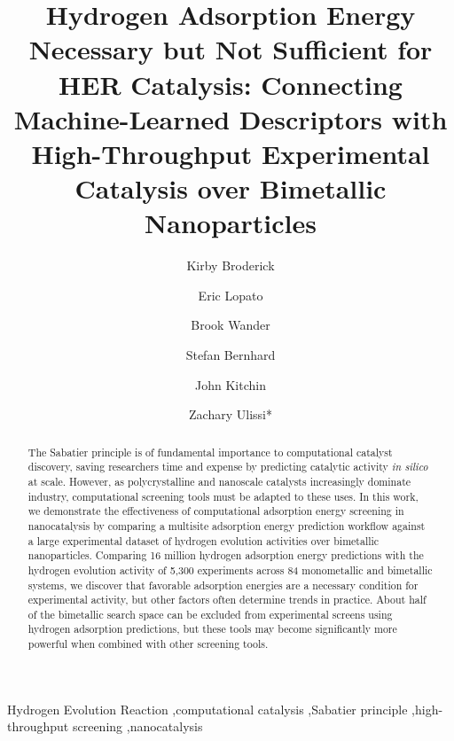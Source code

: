 \documentclass[preprint,12pt]{elsarticle}
\begin{document}
\begin{frontmatter}

\title{Hydrogen Adsorption Energy Necessary but Not Sufficient for HER Catalysis: Connecting Machine-Learned Descriptors with High-Throughput Experimental Catalysis over Bimetallic Nanoparticles}

\author[add1]{Kirby Broderick}
\author[add2]{Eric Lopato}
\author[add1]{Brook Wander}

\author[add2]{Stefan Bernhard}
\author[add1]{John Kitchin}
\author[add1]{Zachary Ulissi*}
\address[add1]{Carnegie Mellon University Department of Chemical Engineering, 5000 Forbes Avenue, Pittsburgh PA 15213, USA}
\address[add2]{Carnegie Mellon University Department of Chemistry, 4400 Fifth Avenue, Pittsburgh PA 15213, USA}

\raggedright
\begin{abstract}
  The Sabatier principle is of fundamental importance to computational catalyst discovery, saving researchers time and expense by predicting catalytic activity \emph{in silico} at scale. However, as polycrystalline and nanoscale catalysts increasingly dominate industry, computational screening tools must be adapted to these uses. In this work, we demonstrate the effectiveness of computational adsorption energy screening in nanocatalysis by comparing a multisite adsorption energy prediction workflow against a large experimental dataset of hydrogen evolution activities over bimetallic nanoparticles. Comparing 16 million hydrogen adsorption energy predictions with the hydrogen evolution activity of 5,300 experiments across 84 monometallic and bimetallic systems, we discover that favorable adsorption energies are a necessary condition for experimental activity, but other factors often determine trends in practice. About half of the bimetallic search space can be excluded from experimental screens using hydrogen adsorption predictions, but these tools may become significantly more powerful when combined with other screening tools.
\end{abstract}

\begin{keyword}
Hydrogen Evolution Reaction \sep computational catalysis \sep Sabatier principle \sep high-throughput screening \sep nanocatalysis
\end{keyword}

\end{frontmatter}
\end{document}
